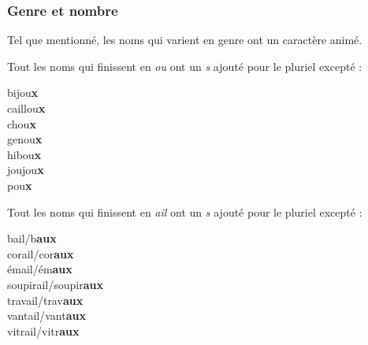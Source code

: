 \documentclass[10pt, french]{article}
\begin{document}
\begin{multicols*}{2}
\subsubsection*{Genre et nombre}
Tel que mentionné, les noms qui varient en genre ont un caractère animé.
\begin{astuces}
Tout les noms qui finissent en \textit{ou} ont un \textit{s} ajouté pour le pluriel excepté :
\begin{multicols*}{2}
\begin{description}
	\item[bijou\textbf{x}]
	\item[caillou\textbf{x}]
	\item[chou\textbf{x}]
	\item[genou\textbf{x}]
	\item[hibou\textbf{x}]
	\item[joujou\textbf{x}]
	\item[pou\textbf{x}]
\end{description}
\end{multicols*}
\end{astuces}

\begin{astuces}
Tout les noms qui finissent en \textit{ail} ont un \textit{s} ajouté pour le pluriel excepté :
\begin{multicols*}{2}
\begin{description}
	\item[bail/b\textbf{aux}]
	\item[corail/cor\textbf{aux}]
	\item[émail/ém\textbf{aux}]
	\item[soupirail/soupir\textbf{aux}]
	\item[travail/trav\textbf{aux}]
	\item[vantail/vant\textbf{aux}]
	\item[vitrail/vitr\textbf{aux}]
\end{description}
\end{multicols*}
\end{astuces}


\end{multicols*}
\end{document}
